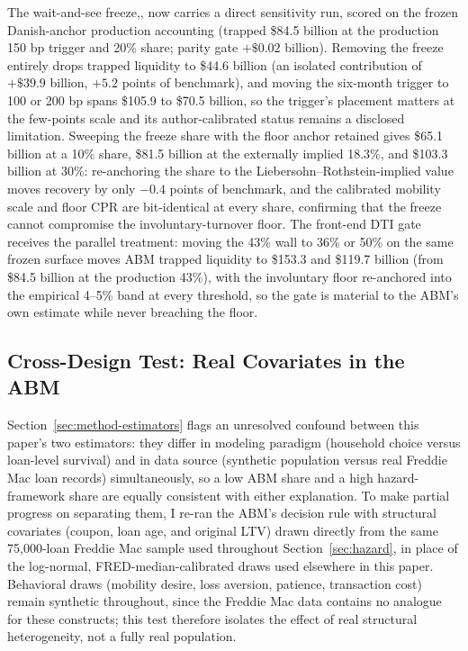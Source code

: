 \documentclass[12pt]{article}
\begin{document}
The wait-and-see freeze,, now carries a direct sensitivity run, scored on the frozen Danish-anchor production accounting (trapped \$84.5 billion at the production 150 bp trigger and 20\% share; parity gate $+\$0.02$ billion). Removing the freeze entirely drops trapped liquidity to \$44.6 billion (an isolated contribution of $+\$39.9$ billion, $+5.2$ points of benchmark), and moving the six-month trigger to 100 or 200 bp spans \$105.9 to \$70.5 billion, so the trigger's placement matters at the few-points scale and its author-calibrated status remains a disclosed limitation. Sweeping the freeze share with the floor anchor retained gives \$65.1 billion at a 10\% share, \$81.5 billion at the externally implied 18.3\%, and \$103.3 billion at 30\%: re-anchoring the share to the Liebersohn--Rothstein-implied value moves recovery by only $-0.4$ points of benchmark, and the calibrated mobility scale and floor CPR are bit-identical at every share, confirming that the freeze cannot compromise the involuntary-turnover floor. The front-end DTI gate receives the parallel treatment: moving the 43\% wall to 36\% or 50\% on the same frozen surface moves ABM trapped liquidity to \$153.3 and \$119.7 billion (from \$84.5 billion at the production 43\%), with the involuntary floor re-anchored into the empirical 4--5\% band at every threshold, so the gate is material to the ABM's own estimate while never breaching the floor.

\subsection{Cross-Design Test: Real Covariates in the ABM}\label{sec:robustness-crossdesign}

Section~\ref{sec:method-estimators} flags an unresolved confound between this paper's two estimators: they differ in modeling paradigm (household choice versus loan-level survival) and in data source (synthetic population versus real Freddie Mac loan records) simultaneously, so a low ABM share and a high hazard-framework share are equally consistent with either explanation. To make partial progress on separating them, I re-ran the ABM's decision rule with structural covariates (coupon, loan age, and original LTV) drawn directly from the same 75,000-loan Freddie Mac sample used throughout Section~\ref{sec:hazard}, in place of the log-normal, FRED-median-calibrated draws used elsewhere in this paper. Behavioral draws (mobility desire, loss aversion, patience, transaction cost) remain synthetic throughout, since the Freddie Mac data contains no analogue for these constructs; this test therefore isolates the effect of real structural heterogeneity, not a fully real population.
\end{document}
